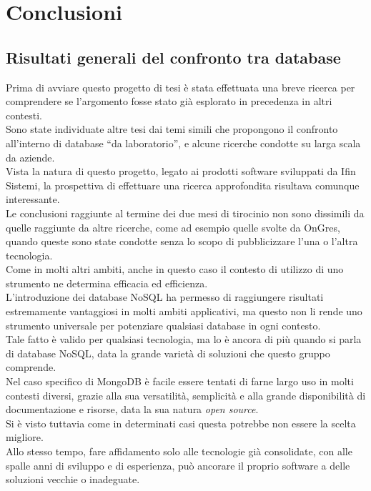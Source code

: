 
\chapter{Conclusioni}
\label{cap:conclusioni}
\section{Risultati generali del confronto tra database}
Prima di avviare questo progetto di tesi è stata effettuata una breve ricerca per comprendere se l'argomento fosse stato già esplorato in precedenza in altri contesti.\\
Sono state individuate altre tesi dai temi simili che propongono il confronto all'interno di database ``da laboratorio'', e alcune ricerche condotte su larga scala da aziende.\\
Vista la natura di questo progetto, legato ai prodotti software sviluppati da Ifin Sistemi, la prospettiva di effettuare una ricerca approfondita risultava comunque interessante.\\

\noindent Le conclusioni raggiunte al termine dei due mesi di tirocinio non sono dissimili da quelle raggiunte da altre ricerche, come ad esempio quelle svolte da OnGres, quando queste sono state condotte senza lo scopo di pubblicizzare l'una o l'altra tecnologia.\\
Come in molti altri ambiti, anche in questo caso il contesto di utilizzo di uno strumento ne determina efficacia ed efficienza.\\
L'introduzione dei database NoSQL ha permesso di raggiungere risultati estremamente vantaggiosi in molti ambiti applicativi, ma questo non li rende uno strumento universale per potenziare qualsiasi database in ogni contesto.\\
Tale fatto è valido per qualsiasi tecnologia, ma lo è ancora di più quando si parla di database NoSQL, data la grande varietà di soluzioni che questo gruppo comprende.\\
Nel caso specifico di MongoDB è facile essere tentati di farne largo uso in molti contesti diversi, grazie alla sua versatilità, semplicità e alla grande disponibilità di documentazione e risorse, data la sua natura \textit{open source}.\\
Si è visto tuttavia come in determinati casi questa potrebbe non essere la scelta migliore.\\
Allo stesso tempo, fare affidamento solo alle tecnologie già consolidate, con alle spalle anni di sviluppo e di esperienza, può ancorare il proprio software a delle soluzioni vecchie o inadeguate.\\

